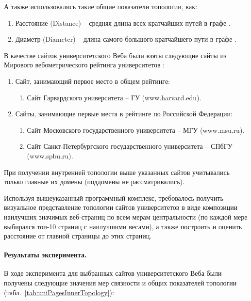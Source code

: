 А также использовались такие общие показатели топологии, как:
\begin{enumerate}
	\item Расстояние (Distance) -- средняя длина всех кратчайших путей в графе \cite{MaksimovBlekanov}. 
	\item Диаметр (Diameter) -- длина самого большого кратчайшего пути в графе \cite{MaksimovBlekanov}.
\end{enumerate}

В качестве сайтов университетского Веба были взяты следующие сайты из Мирового вебометрического рейтинга университетов \cite{RankingWeb}:
\begin{enumerate}
	\item Сайт, занимающий первое место в общем рейтинге:
		\begin{enumerate}
				\item Сайт Гарвардского университета -- ГУ (www.harvard.edu). 
			\end{enumerate}
	\item Сайты, занимающие первые места в рейтинге по Российской Федерации: 
		\begin{enumerate}
				\item Сайт Московского государственного университета -- МГУ (www.msu.ru). 
				\item Сайт Санкт-Петербургского государственного университета -- СПбГУ (www.spbu.ru).
			\end{enumerate}
\end{enumerate}

При получении внутренней топологии выше указанных сайтов учитывались только главные их домены (поддомены не рассматривались). 

Используя вышеуказанный программный комплекс, требовалось получить визуальное представление топологии сайтов университетов в виде композиции наилучших значимых веб-страниц по всем мерам центральности (по каждой мере выбирался топ-10 страниц с наилучшими весами), а также построить и оценить расстояние от главной страницы до этих страниц.

\paragraph{Результаты эксперимента.} В ходе эксперимента для выбранных сайтов университетского Веба были получены следующие значения мер связности и общих показателей топологии (табл.~\cref{tab:uniPagesInnerTopology}):

